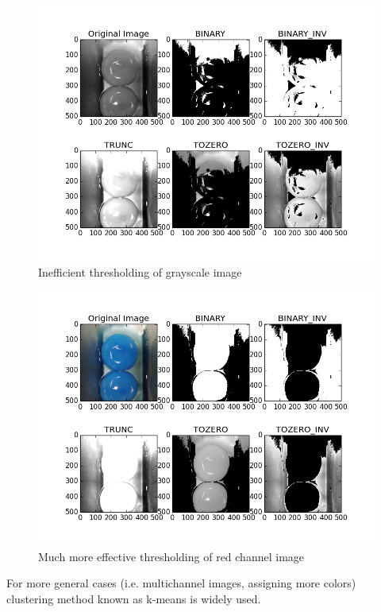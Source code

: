 \documentclass[12pt,twoside,a4paper]{article}
\begin{document}
\begin{figure}[H]
\centering
\includegraphics[width=0.4\paperwidth]{gray}
\caption{Inefficient thresholding of grayscale image}
\end{figure}

\begin{figure}[H]
\centering
\includegraphics[width=0.4\paperwidth]{red}
\caption{Much more effective thresholding of red channel image}
\end{figure}

For more general cases (i.e. multichannel images, assigning more colors) clustering method known as k-means is widely used.\cite{lesscv}
 
\end{document}

